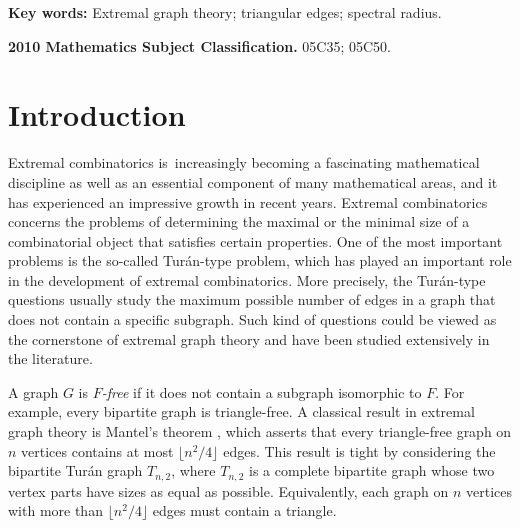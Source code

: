 \documentclass[11pt]{article}
\begin{document}
{{\bf Key words:} Extremal graph theory;  triangular edges; spectral  radius. }

{{\bf 2010 Mathematics Subject Classification.}  05C35; 05C50.}







\section{Introduction} 
Extremal  combinatorics is increasingly becoming 
a fascinating mathematical discipline as well as an essential
component of many mathematical areas, and it has experienced an impressive
growth in recent years. 
Extremal combinatorics concerns the problems  
of determining the maximal or the minimal size of a combinatorial object that satisfies certain properties. 
One of the most important problems is the 
so-called Tur\'{a}n-type problem, which has played an important role in the development 
of extremal combinatorics.  
More precisely,  
the Tur\'{a}n-type questions usually 
study the maximum possible number of edges in
a graph that does not contain a specific subgraph. 
Such kind of questions could be 
viewed as the cornerstone of extremal graph theory and have been studied
extensively in the literature.  

\medskip 
A graph $G$ is {\it $F$-free} if it does not contain a subgraph isomorphic to $F$. 
  For example, every bipartite graph is triangle-free. 
A classical result in extremal graph theory is Mantel's  theorem \cite{Bollobas78}, 
which  asserts that every triangle-free graph on $n$ 
vertices contains at most 
$\lfloor n^2/4\rfloor$ edges. 
This result is tight 
by considering the bipartite Tur\'{a}n graph $T_{n,2}$, where 
$T_{n,2}$ is a complete bipartite graph whose 
two vertex parts have sizes as equal as possible.  
Equivalently, each graph on $n$ vertices
with more than $\lfloor n^2/4\rfloor $ edges must contain a triangle. 
\end{document}

